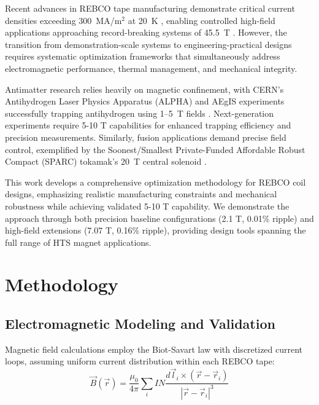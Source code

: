 \documentclass[10pt,twocolumn]{article}
\begin{document}
Recent advances in REBCO tape manufacturing demonstrate critical current densities exceeding 300~MA/m$^2$ at 20~K \cite{abraimov2022}, enabling controlled high-field applications approaching record-breaking systems of 45.5~T \cite{hahn2019}. However, the transition from demonstration-scale systems to engineering-practical designs requires systematic optimization frameworks that simultaneously address electromagnetic performance, thermal management, and mechanical integrity.

Antimatter research relies heavily on magnetic confinement, with CERN's Antihydrogen Laser Physics Apparatus (ALPHA) and AEgIS experiments successfully trapping antihydrogen using 1--5~T fields \cite{alpha2023,aegis2017antihydrogen}. Next-generation experiments require 5-10 T capabilities for enhanced trapping efficiency and precision measurements. Similarly, fusion applications demand precise field control, exemplified by the Soonest/Smallest Private-Funded Affordable Robust Compact (SPARC) tokamak's 20~T central solenoid \cite{sparc2020}.

This work develops a comprehensive optimization methodology for REBCO coil designs, emphasizing realistic manufacturing constraints and mechanical robustness while achieving validated 5-10 T capability. We demonstrate the approach through both precision baseline configurations (2.1 T, 0.01\% ripple) and high-field extensions (7.07 T, 0.16\% ripple), providing design tools spanning the full range of HTS magnet applications.

\section{Methodology}

\subsection{Electromagnetic Modeling and Validation}

Magnetic field calculations employ the Biot-Savart law with discretized current loops, assuming uniform current distribution within each REBCO tape:
\begin{equation}
\vec{B}(\vec{r}) = \frac{\mu_0}{4\pi} \sum_{i} I N \frac{d\vec{l}_i \times (\vec{r} - \vec{r}_i)}{|\vec{r} - \vec{r}_i|^3}
\end{equation}
\end{document}
